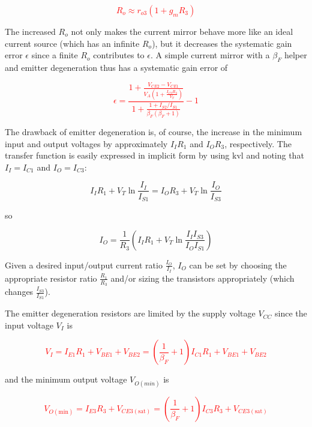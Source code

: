 \textcolor{red}{
\begin{equation}
R_{o} \approx r_{o3}(1+g_{m}R_{3})
\end{equation}
}

The increased $R_{o}$ not only makes the current mirror behave more like an ideal current source (which has an infinite $R_{o}$), but it decreases the systematic gain error $\epsilon$ since a finite $R_{o}$ contributes to $\epsilon$.
A simple current mirror with a $\beta_{F}$ helper and emitter degeneration thus has a systematic gain error of

\textcolor{red}{
\begin{equation}
\epsilon = \frac{1+\frac{V_{CE2}-V_{CE1}}{V_{A}(1+\frac{I_{C3}R_{3}}{V_{T}})}}{1+\frac{1+I_{S2}/I_{S1}}{\beta_{F}(\beta_{F}+1)}}-1
\end{equation}
}

The drawback of emitter degeneration is, of course, the increase in the minimum input and output voltages by approximately $I_{I}R_{1}$ and $I_{O}R_{3}$, respectively.
The transfer function is easily expressed in implicit form by using \ac{kvl} and noting that $I_{I} = I_{C1}$ and $I_{O} = I_{C3}$:

\begin{equation}
I_{I}R_{1}+V_{T}\ln\frac{I_{I}}{I_{S1}} = I_{O}R_{3}+V_{T}\ln\frac{I_{O}}{I_{S3}}
\end{equation}

so

\begin{equation}
I_{O} = \frac{1}{R_{3}}\left(I_{I}R_{1} + V_{T}\ln\frac{I_{I}I_{S3}}{I_{O}I_{S1}}\right)
\end{equation}

Given a desired input/output current ratio $\frac{I_{O}}{I_{I}}$, $I_{O}$ can be set by choosing the appropriate resistor ratio $\frac{R_{1}}{R_{3}}$ and/or sizing the transistors appropriately (which changes $\frac{I_{S3}}{I_{S1}}$).

The emitter degeneration resistors are limited by the supply voltage $V_{CC}$ since the input voltage $V_{I}$ is

\textcolor{red}{
\begin{equation}
V_{I} = I_{E1}R_{1}+V_{BE1}+V_{BE2} = \left(\frac{1}{\beta_{F}}+1\right)I_{C1}R_{1}+V_{BE1}+V_{BE2}
\end{equation}
}

and the minimum output voltage $V_{O(min)}$ is

\textcolor{red}{
\begin{equation}
V_{O(\text{min})} = I_{E3}R_{3}+V_{CE3(\text{sat})} = \left(\frac{1}{\beta_{F}}+1\right)I_{C3}R_{3}+V_{CE3(\text{sat})}
\end{equation}
}

